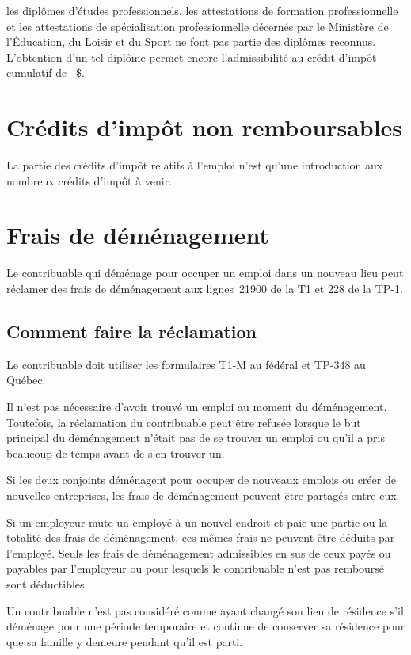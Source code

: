 \begin{note}
	les diplômes d'études professionnels, les attestations de formation professionnelle et les attestations de spécialisation professionnelle décernés par le Ministère de l'Éducation, du Loisir et du Sport ne font pas partie des diplômes reconnus. L'obtention d'un tel diplôme permet encore l'admissibilité au crédit d'impôt cumulatif de ~\$.
\end{note}



\section{Crédits d'impôt non remboursables}
La partie des crédits d'impôt relatifs à l'emploi n'est qu'une introduction aux nombreux crédits d'impôt à venir.



\section{Frais de déménagement}
Le contribuable qui déménage pour occuper un emploi dans un nouveau lieu peut réclamer des frais de déménagement aux lignes~21900 de la T1 et 228 de la TP-1.


\subsection{Comment faire la réclamation}
Le contribuable doit utiliser les formulaires T1-M au fédéral et TP-348 au Québec.

Il n'est pas nécessaire d'avoir trouvé un emploi au moment du déménagement. Toutefois, la réclamation du contribuable peut être refusée lorsque le but principal du déménagement n'était pas de se trouver un emploi ou qu'il a pris beaucoup de temps avant de s'en trouver un.

Si les deux conjoints déménagent pour occuper de nouveaux emplois ou créer de nouvelles entreprises, les frais de déménagement peuvent être partagés entre eux.

Si un employeur mute un employé à un nouvel endroit et paie une partie ou la totalité des frais de déménagement, ces mêmes frais ne peuvent être déduits par l'employé. Seuls les frais de déménagement admissibles en sus de ceux payés ou payables par l'employeur ou pour lesquels le contribuable n'est pas remboursé sont déductibles.

Un contribuable n'est pas considéré comme ayant changé son lieu de résidence s'il déménage pour une période temporaire et continue de conserver sa résidence pour que sa famille y demeure pendant qu'il est parti.


